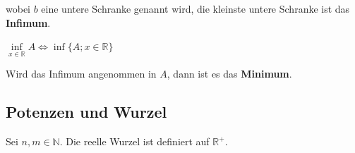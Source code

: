 \documentclass[a4paper, fontsize = 8pt, landscape]{scrartcl}
\newcommand{\R}[0]{\mathbb{R}}
\newcommand{\N}[0]{\mathbb{N}}
\begin{document}
\begin{multicols*}{3}
\begin{center}
\begin{minipage}{0.48\linewidth}
            wobei $b$ eine untere Schranke genannt wird, die kleinste untere Schranke ist das \textbf{Infimum}.

            \begin{center}
                $\inf\limits_{x \in \R} A \Leftrightarrow \inf\{A; x \in \R\}$
            \end{center}

            Wird das Infimum angenommen in $A$, dann ist es das \textbf{Minimum}.

        \end{minipage}
    \end{center}


    \subsection{Potenzen und Wurzel}

    Sei $n,m \in \N$. Die reelle Wurzel ist definiert auf $\R^+$.


\end{multicols*}
\end{document}
